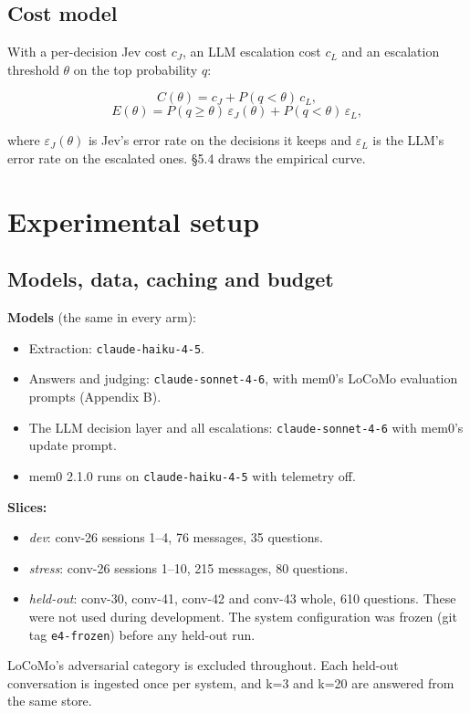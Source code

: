 \documentclass[11pt]{article}
\newcommand{\src}[1]{}
\begin{document}
\subsection{Cost model}
With a per-decision Jev cost $c_J$, an LLM escalation cost $c_L$ and an escalation threshold $\theta$ on the top probability $q$:

\[C(\theta) = c_J + P(q < \theta)\, c_L ,\] \[E(\theta) = P(q \ge \theta)\, \varepsilon_J(\theta) + P(q < \theta)\, \varepsilon_L ,\]

where $\varepsilon_J(\theta)$ is Jev's error rate on the decisions it keeps and $\varepsilon_L$ is the LLM's error rate on the escalated ones. \S{}5.4 draws the empirical curve.

\section{Experimental setup}
\subsection{Models, data, caching and budget}
\textbf{Models} (the same in every arm):

\begin{itemize}
\item Extraction: \texttt{claude-haiku-4-5}.
\item Answers and judging: \texttt{claude-sonnet-4-6}, with mem0's LoCoMo evaluation prompts (Appendix B).
\item The LLM decision layer and all escalations: \texttt{claude-sonnet-4-6} with mem0's update prompt.
\item mem0 2.1.0 runs on \texttt{claude-haiku-4-5} with telemetry off.
\end{itemize}
\textbf{Slices:}

\begin{itemize}
\item \emph{dev}: conv-26 sessions 1--4, 76\src{bench/results/e2_jev__dev.json} messages, 35\src{bench/results/e2_jev__dev.json} questions.
\item \emph{stress}: conv-26 sessions 1--10, 215\src{bench/results/e2_jev__stress.json} messages, 80\src{bench/results/e2_jev__stress.json} questions.
\item \emph{held-out}: conv-30, conv-41, conv-42 and conv-43 whole, 610\src{bench/results/heldout_report.json} questions. These were not used during development. The system configuration was frozen (git tag \texttt{e4-frozen}) before any held-out run.
\end{itemize}
LoCoMo's adversarial category is excluded throughout. Each held-out conversation is ingested once per system, and k=3 and k=20 are answered from the same store.
\end{document}
